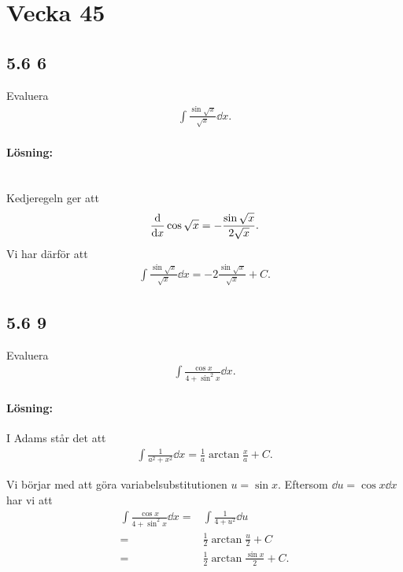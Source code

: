 \section{Vecka 45}%
\label{sec:vecka_45}


\subsection{5.6 6}%
\label{sub:5_6_6}

Evaluera
\begin{align*}
	\int \frac{\sin \sqrt{x}}{\sqrt{x}} \dd{x}.
\end{align*}

\paragraph{Lösning:}

~\\
Kedjeregeln ger att
\begin{align*}
	\derivative{}{x} \cos \sqrt{x} = -\frac{\sin \sqrt{x}}{2 \sqrt{x}}.
\end{align*}
Vi har därför att
\begin{align*}
	\int \frac{\sin \sqrt{x}}{\sqrt{x}} \dd{x} = -2 \frac{\sin \sqrt{x}}{\sqrt{x}} + C.
\end{align*}


\subsection{5.6 9}%
\label{sub:5_6_9}

Evaluera
\begin{align*}
	\int \frac{\cos{x}}{4 + \sin^2{x}} \dd{x}.
\end{align*}

\paragraph{Lösning:}

I Adams står det att
\begin{align*}
	\int \frac{1}{a^2 + x^2} \dd{x} = \frac{1}{a} \arctan \frac{x}{a} + C.
\end{align*}

Vi börjar med att göra variabelsubstitutionen $u = \sin x$.
Eftersom $\dd{u} = \cos{x} \dd{x}$ har vi att
\begin{align*}
	\int \frac{\cos{x}}{4 + \sin^2{x}} \dd{x} ={}& \int \frac{1}{4 + u^2} \dd{u}\\
	={}& \frac{1}{2} \arctan \frac{u}{2} + C\\
	={}& \frac{1}{2} \arctan \frac{\sin x}{2} + C.
\end{align*}


